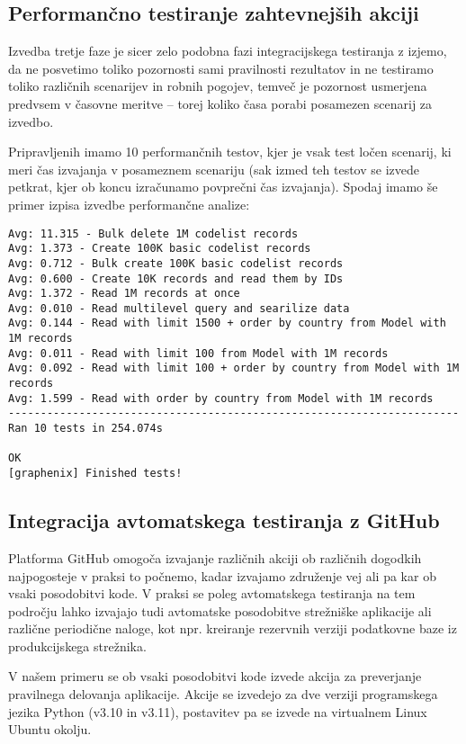 \documentclass[a4paper,12pt,openright]{book}
\begin{document}
   \subsection{Performančno testiranje zahtevnejših akciji}

    Izvedba tretje faze je sicer zelo podobna fazi integracijskega testiranja z izjemo, da ne posvetimo toliko pozornosti sami pravilnosti rezultatov in ne testiramo toliko različnih scenarijev in robnih pogojev, temveč je pozornost usmerjena predvsem v časovne meritve – torej koliko časa porabi posamezen scenarij za izvedbo.

    Pripravljenih imamo 10 performančnih testov, kjer je vsak test ločen scenarij, ki meri čas izvajanja v posameznem scenariju (sak izmed teh testov se izvede petkrat, kjer ob koncu izračunamo povprečni čas izvajanja). Spodaj imamo še primer izpisa izvedbe performančne analize:

\begin{verbatim}
Avg: 11.315 - Bulk delete 1M codelist records
Avg: 1.373 - Create 100K basic codelist records
Avg: 0.712 - Bulk create 100K basic codelist records
Avg: 0.600 - Create 10K records and read them by IDs
Avg: 1.372 - Read 1M records at once
Avg: 0.010 - Read multilevel query and searilize data
Avg: 0.144 - Read with limit 1500 + order by country from Model with 1M records
Avg: 0.011 - Read with limit 100 from Model with 1M records
Avg: 0.092 - Read with limit 100 + order by country from Model with 1M records
Avg: 1.599 - Read with order by country from Model with 1M records
----------------------------------------------------------------------
Ran 10 tests in 254.074s

OK
[graphenix] Finished tests!
\end{verbatim}
   
   \subsection{Integracija avtomatskega testiranja z GitHub}

   Platforma GitHub omogoča izvajanje različnih akciji ob različnih dogodkih najpogosteje v praksi to počnemo, kadar izvajamo združenje vej ali pa kar ob vsaki posodobitvi kode. V praksi se poleg avtomatskega testiranja na tem področju lahko izvajajo tudi avtomatske posodobitve strežniške aplikacije ali različne periodične naloge, kot npr. kreiranje rezervnih verziji podatkovne baze iz produkcijskega strežnika.

   V našem primeru se ob vsaki posodobitvi kode izvede akcija za preverjanje pravilnega delovanja aplikacije. Akcije se izvedejo za dve verziji programskega jezika Python (v3.10 in v3.11), postavitev pa se izvede na virtualnem Linux Ubuntu okolju.
\end{document}
